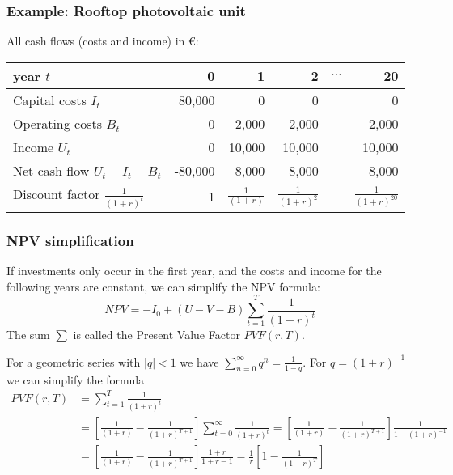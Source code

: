 \documentclass[10pt,aspectratio=169,dvipsnames]{beamer}
\begin{document}
\begin{frame}
  \frametitle{Example: Rooftop photovoltaic unit}

    All cash flows (costs and income) in \euro:
    \begin{table}[!t]
    \begin{tabular}{lrrrrr}
      \toprule
      year $t$ &  0 & 1 & 2 & $\cdots$ & 20 \\
      \midrule
      Capital costs $I_t$ & 80,000  & 0 & 0  & & 0\\
      Operating costs $B_t$ & 0 & 2,000 & 2,000 & & 2,000  \\
      Income $U_t$ & 0 & 10,000  & 10,000 & & 10,000 \\
      \midrule
      Net cash flow $U_t - I_t - B_t$ & -80,000 & 8,000 & 8,000 & & 8,000 \\
      \midrule
      Discount factor $\frac{1}{(1+r)^t}$ & 1 & $\frac{1}{(1+r)}$ & $\frac{1}{(1+r)^2}$ & &  $\frac{1}{(1+r)^{20}}$ \\
      \bottomrule
    \end{tabular}
    \end{table}


\end{frame}



\begin{frame}
  \frametitle{NPV simplification}

  If investments only occur in the first year, and the costs and income for the following years are constant, we can simplify the NPV formula:
  \begin{equation*}
    NPV = -I_0 + (U - V - B) \sum_{t=1}^T \frac{1}{(1+r)^t}
  \end{equation*}
  The sum $\sum$ is called the \alert{Present Value Factor} $PVF(r,T)$.

  For a geometric series with $|q| < 1$ we have $\sum_{n=0}^\infty q^n = \frac{1}{1-q}$.
  For $q= (1+r)^{-1}$ we can simplify the formula
  \begin{align*}
    PVF(r,T) & =  \sum_{t=1}^T \frac{1}{(1+r)^t} \\
             & = \left[\frac{1}{(1+r)} - \frac{1}{(1+r)^{T+1}}  \right] \sum_{t=0}^\infty \frac{1}{(1+r)^t}
              = \left[\frac{1}{(1+r)} - \frac{1}{(1+r)^{T+1}}  \right] \frac{1}{1 - (1+r)^{-1}} \\
             & = \left[\frac{1}{(1+r)} - \frac{1}{(1+r)^{T+1}}  \right] \frac{1+r}{1 + r  - 1}  = \frac{1}{r} \left[1  - \frac{1}{(1+r)^{T}}  \right]
  \end{align*}

\end{frame}
\end{document}
